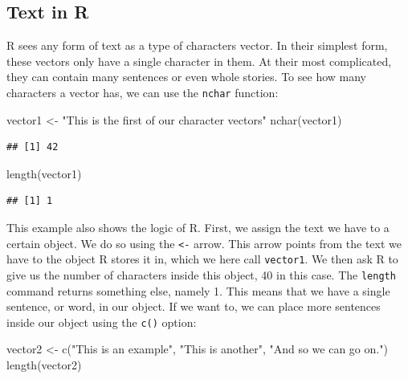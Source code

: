 \documentclass[
]{article}
\newenvironment{Shaded}{\begin{snugshade}}{\end{snugshade}}
\newcommand{\FunctionTok}[1]{\textcolor[rgb]{0.00,0.00,0.00}{#1}}
\newcommand{\NormalTok}[1]{#1}
\newcommand{\OtherTok}[1]{\textcolor[rgb]{0.56,0.35,0.01}{#1}}
\newcommand{\StringTok}[1]{\textcolor[rgb]{0.31,0.60,0.02}{#1}}
\begin{document}
\hypertarget{text-in-r}{%
\subsection{Text in R}\label{text-in-r}}

R sees any form of text as a type of characters vector. In their simplest form, these vectors only have a single character in them. At their most complicated, they can contain many sentences or even whole stories. To see how many characters a vector has, we can use the \texttt{nchar} function:

\begin{Shaded}
\begin{Highlighting}[]
\NormalTok{vector1 }\OtherTok{\textless{}{-}} \StringTok{"This is the first of our character vectors"}
\FunctionTok{nchar}\NormalTok{(vector1)}
\end{Highlighting}
\end{Shaded}

\begin{verbatim}
## [1] 42
\end{verbatim}

\begin{Shaded}
\begin{Highlighting}[]
\FunctionTok{length}\NormalTok{(vector1)}
\end{Highlighting}
\end{Shaded}

\begin{verbatim}
## [1] 1
\end{verbatim}

This example also shows the logic of R. First, we assign the text we have to a certain object. We do so using the \texttt{\textless{}-} arrow. This arrow points from the text we have to the object R stores it in, which we here call \texttt{vector1}. We then ask R to give us the number of characters inside this object, 40 in this case. The \texttt{length} command returns something else, namely 1. This means that we have a single sentence, or word, in our object. If we want to, we can place more sentences inside our object using the \texttt{c()} option:

\begin{Shaded}
\begin{Highlighting}[]
\NormalTok{vector2 }\OtherTok{\textless{}{-}} \FunctionTok{c}\NormalTok{(}\StringTok{"This is an example"}\NormalTok{, }\StringTok{"This is another"}\NormalTok{, }\StringTok{"And so we can go on."}\NormalTok{)}
\FunctionTok{length}\NormalTok{(vector2)}
\end{Highlighting}
\end{Shaded}
\end{document}
